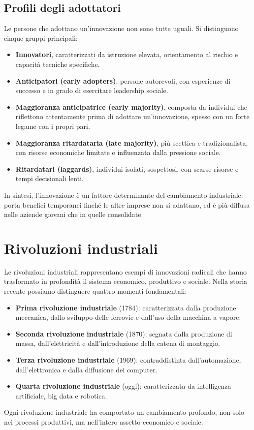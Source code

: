 \subsection*{Profili degli adottatori}
Le persone che adottano un’innovazione non sono tutte uguali. Si distinguono cinque gruppi principali:
\begin{itemize}
    \item \textbf{Innovatori}, caratterizzati da istruzione elevata, orientamento al rischio e capacità tecniche specifiche.
    \item \textbf{Anticipatori (early adopters)}, persone autorevoli, con esperienze di successo e in grado di esercitare leadership sociale.
    \item \textbf{Maggioranza anticipatrice (early majority)}, composta da individui che riflettono attentamente prima di adottare un’innovazione, spesso con un forte legame con i propri pari.
    \item \textbf{Maggioranza ritardataria (late majority)}, più scettica e tradizionalista, con risorse economiche limitate e influenzata dalla pressione sociale.
    \item \textbf{Ritardatari (laggards)}, individui isolati, sospettosi, con scarse risorse e tempi decisionali lenti.
\end{itemize}

In sintesi, l’innovazione è un fattore determinante del cambiamento industriale: porta benefici temporanei finché le altre imprese non si adattano, ed è più diffusa nelle aziende giovani che in quelle consolidate.

\section{Rivoluzioni industriali}
Le rivoluzioni industriali rappresentano esempi di innovazioni radicali che hanno trasformato in profondità il sistema economico, produttivo e sociale.  
Nella storia recente possiamo distinguere quattro momenti fondamentali:

\begin{itemize}
    \item \textbf{Prima rivoluzione industriale} (1784): caratterizzata dalla produzione meccanica, dallo sviluppo delle ferrovie e dall’uso della macchina a vapore.
    \item \textbf{Seconda rivoluzione industriale} (1870): segnata dalla produzione di massa, dall’elettricità e dall’introduzione della catena di montaggio.
    \item \textbf{Terza rivoluzione industriale} (1969): contraddistinta dall’automazione, dall’elettronica e dalla diffusione dei computer.
    \item \textbf{Quarta rivoluzione industriale} (oggi): caratterizzata da intelligenza artificiale, big data e robotica.
\end{itemize}

Ogni rivoluzione industriale ha comportato un cambiamento profondo, non solo nei processi produttivi, ma nell’intero assetto economico e sociale.